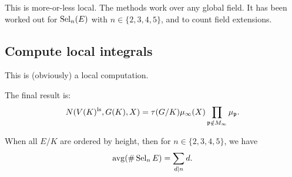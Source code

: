 This is more-or-less local. The methods work over any global field. It has 
been worked out for $\operatorname{Sel}_n(E)$ with $n\in \{2,3,4,5\}$, and to count field 
extensions. 





\subsection{Compute local integrals}

This is (obviously) a local computation. 

The final result is: 
\[
  N(V(K)^\mathrm{ls},G(K),X) = \tau(G/K) \mu_\infty(X) \prod_{\mathfrak{p}\notin M_\infty} \mu_{\mathfrak{p}} .
\]

\begin{theo}
When all $E/K$ are ordered by height, then for $n\in \{2,3,4,5\}$, we have 
\[
  \operatorname{avg}(\#\operatorname{Sel}_n E) = \sum_{d\mid n} d .
\]
\end{theo}




